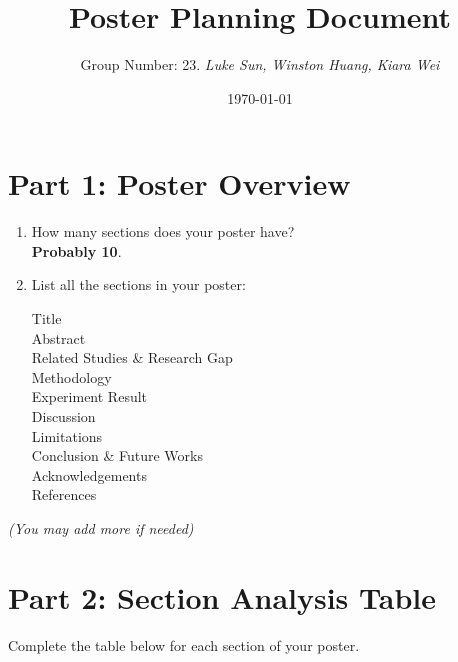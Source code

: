 \documentclass{article}
\title{\vspace{-3em} Poster Planning Document}
\author{Group Number: 23.  \textit{Luke Sun, Winston Huang, Kiara Wei}}
\date{\today}
\begin{document}
\maketitle

\section*{Part 1: Poster Overview}

\begin{enumerate}
    \item How many sections does your poster have? \\[5pt] \textbf{Probably 10}.


    \item List all the sections in your poster:
    \begin{description}
        \item[Title] 
        \item[Abstract]
        \item[Related Studies \& Research Gap] 
        \item[Methodology]
        \item[Experiment Result]
        \item[Discussion]
        \item[Limitations]
        \item[Conclusion \& Future Works]
        \item[Acknowledgements]
        \item[References]       
    \end{description}

\end{enumerate}

\begin{flushright}
    \small\textit{(You may add more if needed)}
\end{flushright}

\vspace{0.5cm}

\section*{Part 2: Section Analysis Table}
Complete the table below for each section of your poster.

\vspace{0.5cm}
\end{document}
